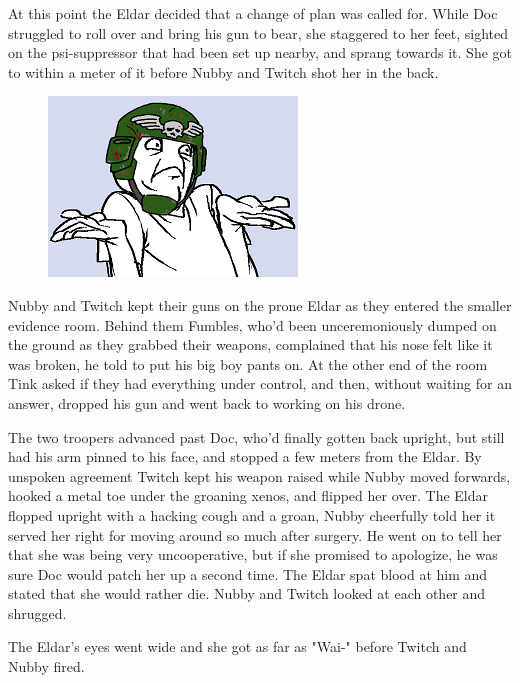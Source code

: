 At this point the Eldar decided that a change of plan was called for. 
While Doc struggled to roll over and bring his gun to bear, she staggered to her feet, sighted on the psi-suppressor that had been set up nearby, and sprang towards it. 
She got to within a meter of it before Nubby and Twitch shot her in the back.

\begin{figure}
	\begin{center}
		\includegraphics[width=\figwidth]{pics/16/39.png}
	\end{center}
\end{figure}
Nubby and Twitch kept their guns on the prone Eldar as they entered the smaller evidence room. 
Behind them Fumbles, who'd been unceremoniously dumped on the ground as they grabbed their weapons, complained that his nose felt like it was broken, he told to put his big boy pants on. 
At the other end of the room Tink asked if they had everything under control, and then, without waiting for an answer, dropped his gun and went back to working on his drone.

The two troopers advanced past Doc, who'd finally gotten back upright, but still had his arm pinned to his face, and stopped a few meters from the Eldar. 
By unspoken agreement Twitch kept his weapon raised while Nubby moved forwards, hooked a metal toe under the groaning xenos, and flipped her over. 
The Eldar flopped upright with a hacking cough and a groan, Nubby cheerfully told her it served her right for moving around so much after surgery. 
He went on to tell her that she was being very uncooperative, but if she promised to apologize, he was sure Doc would patch her up a second time. 
The Eldar spat blood at him and stated that she would rather die. 
Nubby and Twitch looked at each other and shrugged.



The Eldar's eyes went wide and she got as far as "Wai-" before Twitch and Nubby fired.

